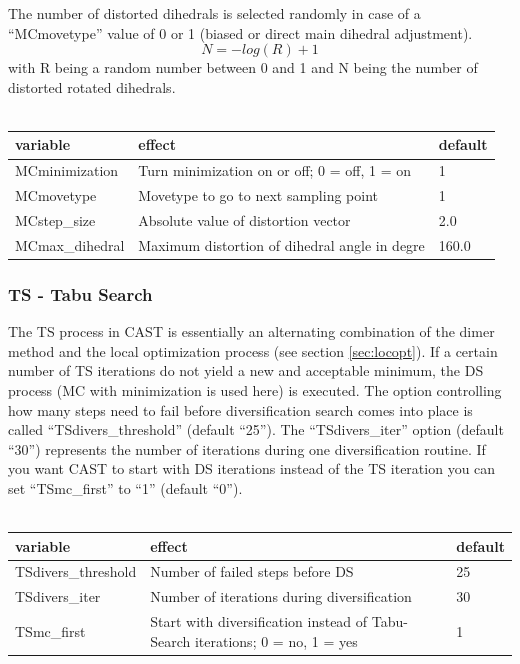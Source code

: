 \documentclass[10pt,a4paper]{article} %
\begin{document}
	The number of distorted dihedrals is selected randomly in case of a ``MCmovetype'' value of 0 or 1 (biased or direct main dihedral adjustment).
	\begin{equation}
	N = - log (R) + 1
	\end{equation}
	with R being a random number between 0 and 1 and N being the number of distorted rotated dihedrals.\\~\\
	\begin{longtable}{|p{3.5cm}|p{5cm}|p{2.5cm}|}
		variable & effect & default \\
		\hline
		MCminimization & Turn minimization on or off; 0 = off, 1 = on & 1 \\
		MCmovetype & Movetype to go to next sampling point & 1 \\
		MCstep\_size & Absolute value of distortion vector & 2.0 \\
		MCmax\_dihedral & Maximum distortion of dihedral angle in degre & 160.0 \\
	\end{longtable}
		
	\subsubsection{TS - Tabu Search}
	The \acf{TS} process in \ac{CAST} is essentially an alternating combination of the dimer method\cite{dimermethod} and the local optimization process (see section \ref{sec:locopt}).
	If a certain number of \ac{TS} iterations do not yield a new and acceptable minimum, the \acf{DS} process (\ac{MC} with minimization is used here) is executed. The option controlling how many steps need to fail before diversification search comes into place is called ``TSdivers\_threshold'' (default ``25'').
	The ``TSdivers\_iter'' option (default ``30'') represents the number of iterations during one diversification routine.
	If you want \ac{CAST} to start with \ac{DS} iterations instead of the \ac{TS} iteration you can set ``TSmc\_first'' to ``1'' (default ``0'').\\~\\
	
	\begin{longtable}{|p{3.5cm}|p{5cm}|p{2.5cm}|}
		variable & effect & default \\
		\hline
		TSdivers\_threshold & Number of failed steps before \acl{DS} & 25 \\
		TSdivers\_iter & Number of iterations during diversification & 30 \\
		TSmc\_first & Start with diversification instead of Tabu-Search iterations; 0 = no, 1 = yes & 1 \\
	\end{longtable}
\end{document}

